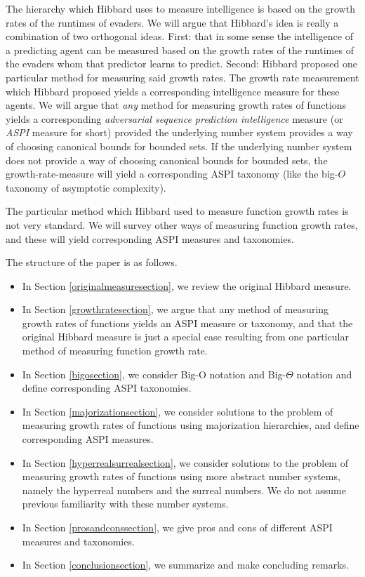 \documentclass[twoside,11pt]{article}
\begin{document}
The hierarchy which Hibbard uses to measure intelligence is based on the growth
rates of the runtimes of evaders.
We will argue that Hibbard's idea is really a combination of two
orthogonal ideas. First: that in some sense the intelligence of a predicting agent
can be measured based on the growth rates of the runtimes of the evaders whom that
predictor learns to predict. Second: Hibbard proposed one particular method for
measuring said growth rates. The growth rate measurement which Hibbard proposed yields
a corresponding intelligence measure for these agents. We will argue that \emph{any}
method for measuring growth rates of functions yields a corresponding
\emph{adversarial sequence prediction intelligence} measure (or \emph{ASPI} measure
for short) provided the underlying number system provides a way of choosing canonical bounds
for bounded sets. If the underlying number system does not provide a way of choosing
canonical bounds for bounded sets, the growth-rate-measure will yield a corresponding
ASPI taxonomy (like the big-$O$ taxonomy of asymptotic complexity).

The particular method which Hibbard used to measure function growth rates is
not very standard. We will survey other
ways of measuring function growth rates,
and these will yield corresponding ASPI measures and taxonomies.

The structure of the paper is as follows.
\begin{itemize}
    \item
    In Section \ref{originalmeasuresection}, we review the original Hibbard measure.
    \item
    In Section \ref{growthratesection}, we argue that any method of measuring
    growth rates of functions yields an ASPI measure or taxonomy,
    and that the original Hibbard measure is just a special case resulting from
    one particular method of measuring function growth rate.
    \item
    In Section \ref{bigosection}, we consider Big-O notation and Big-$\Theta$ notation
    and define corresponding ASPI taxonomies.
    \item
    In Section \ref{majorizationsection}, we consider solutions to the problem of
    measuring growth rates of functions using majorization hierarchies, and define
    corresponding ASPI measures.
    \item
    In Section \ref{hyperrealsurrealsection}, we consider solutions to the
    problem of measuring growth rates of functions using more abstract number
    systems, namely the hyperreal numbers and the surreal numbers. We do not
    assume previous familiarity with these number systems.
    \item
    In Section \ref{prosandconssection}, we give pros and cons of different
    ASPI measures and taxonomies.
    \item
    In Section \ref{conclusionsection}, we summarize and make concluding remarks.
\end{itemize}
\end{document}

